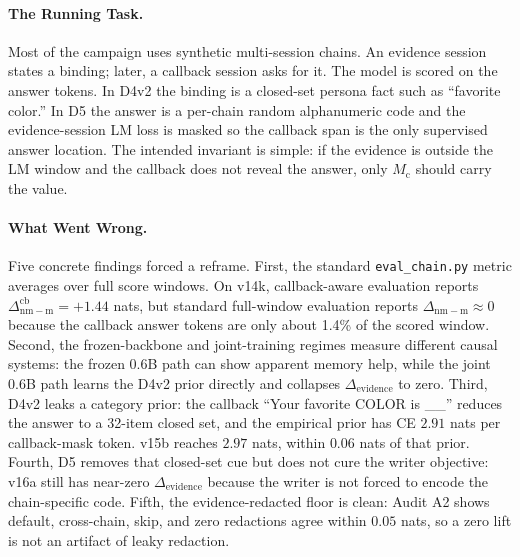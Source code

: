 \documentclass{article}
\newcommand{\Mc}{M_{\mathrm{c}}}
\newcommand{\dnm}{\Delta_{\mathrm{nm-m}}}
\newcommand{\elift}{\Delta_{\mathrm{evidence}}}
\begin{document}
\paragraph{The Running Task.}
Most of the campaign uses synthetic multi-session chains.  An evidence
session states a binding; later, a callback session asks for it.  The
model is scored on the answer tokens.  In D4v2 the binding is a
closed-set persona fact such as ``favorite color.''  In D5 the answer is
a per-chain random alphanumeric code and the evidence-session LM loss is
masked so the callback span is the only supervised answer location.
The intended invariant is simple: if the evidence is outside the LM
window and the callback does not reveal the answer, only $\Mc$ should
carry the value.

\paragraph{What Went Wrong.}
Five concrete findings forced a reframe.  First, the standard
\texttt{eval\_chain.py} metric averages over full score windows.  On
v14k, callback-aware evaluation reports $\dnm^{\mathrm{cb}}=+1.44$ nats,
but standard full-window evaluation reports $\dnm \approx 0$ because
the callback answer tokens are only about 1.4\% of the scored window.
Second, the frozen-backbone and joint-training regimes measure
different causal systems: the frozen 0.6B path can show apparent memory
help, while the joint 0.6B path learns the D4v2 prior directly and
collapses $\elift$ to zero.  Third, D4v2 leaks a category prior: the
callback ``Your favorite COLOR is \_\_'' reduces the answer to a
32-item closed set, and the empirical prior has CE $2.91$ nats per
callback-mask token.  v15b reaches $2.97$ nats, within $0.06$ nats of
that prior.  Fourth, D5 removes that closed-set cue but does not cure
the writer objective: v16a still has near-zero $\elift$ because the
writer is not forced to encode the chain-specific code.  Fifth, the
evidence-redacted floor is clean: Audit A2 shows default, cross-chain,
skip, and zero redactions agree within $0.05$ nats, so a zero lift is
not an artifact of leaky redaction.
\end{document}
